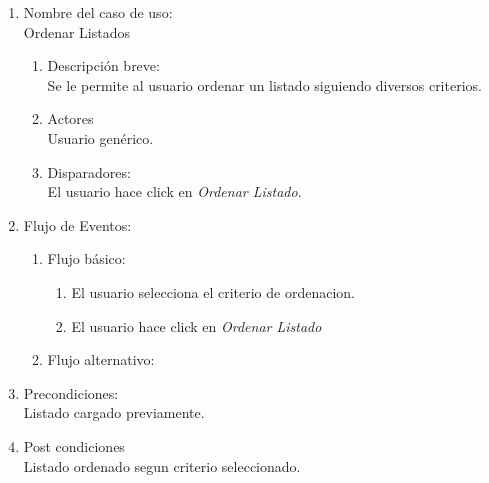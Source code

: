 \documentclass[a4paper,11pt]{article}
\begin{document}
\begin{enumerate}

    \item Nombre del caso de uso: \\
    Ordenar Listados

    \begin{enumerate}
    \item Descripción breve: \\
        Se le permite al usuario ordenar un listado siguiendo diversos criterios.
    \item Actores \\
        Usuario genérico.
    \item Disparadores: \\
        El usuario hace click en \emph{Ordenar Listado}.
    \end{enumerate}

    \item Flujo de Eventos: \\

    \begin{enumerate}

        \item Flujo básico:\\          
	\begin{enumerate}
                    \item El usuario selecciona el criterio de ordenacion.
                    \item El usuario hace click en \emph{Ordenar Listado}
        \end{enumerate}
        \item Flujo alternativo:\\

    \end{enumerate}

    \item Precondiciones: \\
	Listado cargado previamente.

    \item Post condiciones \\
        Listado ordenado segun criterio seleccionado.

\end{enumerate}

\end{document}
